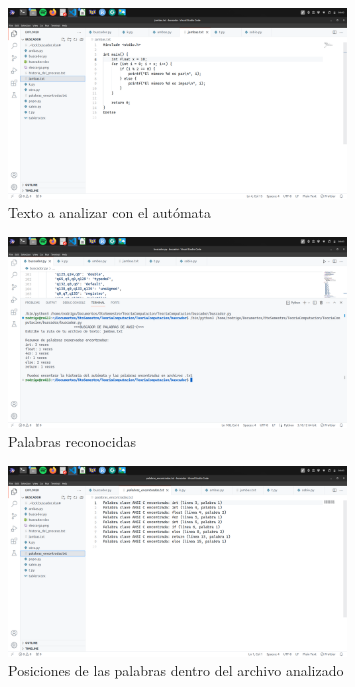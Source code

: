 \documentclass[11pt]{article} %
\begin{document}
	
	\begin{figure}[H]
		\centering
		\includegraphics[width=0.8\textwidth]{imagen1.png}
		\caption{Texto a analizar con el autómata}
	\end{figure}
	
	\begin{figure}[H]
		\centering
		\includegraphics[width=0.8\textwidth]{imagen2.png}
		\caption{Palabras reconocidas}
	\end{figure}
	
	\begin{figure}[H]
		\centering
		\includegraphics[width=0.8\textwidth]{imagen4.png}
		\caption{Posiciones de las palabras dentro del archivo analizado}
	\end{figure}
	
\end{document}
